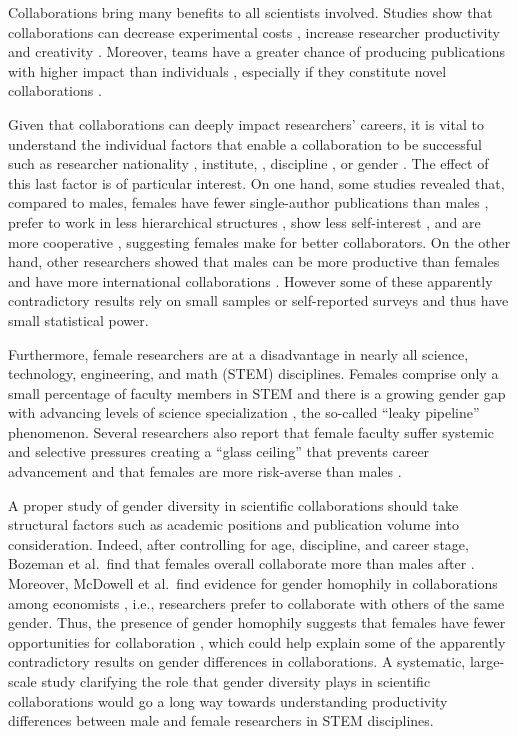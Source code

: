 Collaborations bring many benefits to all scientists involved. Studies show that collaborations can decrease experimental costs \cite{Dyer2002}, increase researcher productivity \cite{Wood1991,Bordons1996,Gajda2004} and creativity \cite{Ahuja2000,Uzzi2005}. Moreover, teams have a greater chance of producing publications with higher impact than individuals \cite{Wuchty2007}, especially if they constitute novel collaborations \cite{Guimera2005,Katzenback2008}.

Given that collaborations can deeply impact researchers' careers, it is vital to understand the individual factors that enable a collaboration to be successful such as researcher nationality \cite{Schubert2006}, institute, \cite{Cummings2005}, discipline \cite{Jones2008}, or gender \cite{West2013}. The effect of this last factor is of particular interest. On one hand, some studies revealed that, compared to males, females have fewer single-author publications than males \cite{Kyvik1996}, prefer to work in less hierarchical structures \cite{Berdahl2005}, show less self-interest \cite{Bart2013}, and are more cooperative \cite{Kummerli2007}, suggesting females make for better collaborators. On the other hand, other researchers showed that males can be more productive than females \cite{Wanner1981,Lee2005} and have more international collaborations \cite{Abramo2013}. However some of these apparently contradictory results rely on small samples or self-reported surveys and thus have small statistical power.

Furthermore, female researchers are at a disadvantage in nearly all science, technology, engineering, and math (STEM) disciplines. Females comprise only a small percentage of faculty members \cite{Duch2012} in STEM and there is a growing gender gap with advancing levels of science specialization \cite{Leadley2009}, the so-called ``leaky pipeline'' phenomenon. Several researchers also report that female faculty suffer systemic and selective pressures creating a ``glass ceiling'' that prevents career advancement \cite{Menges1983,Jacobs2005,Carnes2008,Wolfinger2008,Moss-Racusin2012} and that females are more risk-averse than males \cite{Harris2006}.

A proper study of gender diversity in scientific collaborations should take structural factors such as academic positions and publication volume into consideration. Indeed, after controlling for age, discipline, and career stage, Bozeman et al.\ find that females overall collaborate more than males after \cite{Bozeman2004,Bozeman2011}. Moreover, McDowell et al.\ find evidence for gender homophily in collaborations among economists \cite{McDowell1992}, i.e., researchers prefer to collaborate with others of the same gender. Thus, the presence of gender homophily suggests that females have fewer opportunities for collaboration \cite{Kegen2013}, which could help explain some of the apparently contradictory results on gender differences in collaborations. A systematic, large-scale study clarifying the role that gender diversity plays in scientific collaborations would go a long way towards understanding productivity differences between male and female researchers in STEM disciplines.


